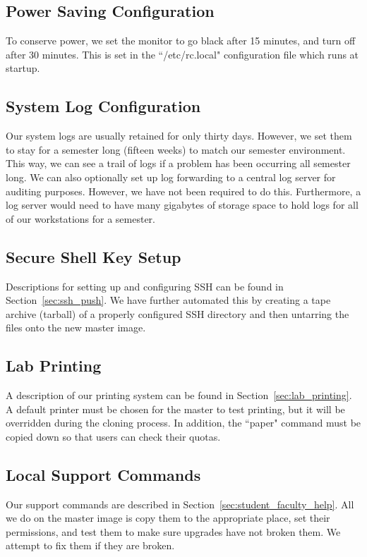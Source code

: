 \subsection{Power Saving Configuration}
To conserve power, we set the monitor to go black after 15 minutes, and turn off after 30 minutes.  This is set in the ``/etc/rc.local" configuration file which runs at startup.  

\subsection{System Log Configuration}
Our system logs are usually retained for only thirty days.  However, we set them to stay for a semester long (fifteen weeks) to match our semester environment.  This way, we can see a trail of logs if a problem has been occurring all semester long.  We can also optionally set up log forwarding to a central log server for auditing purposes.  However, we have not been required to do this.  Furthermore, a log server would need to have many gigabytes of storage space to hold logs for all of our workstations for a semester.  

\subsection{Secure Shell Key Setup}
Descriptions for setting up and configuring SSH can be found in Section~\ref{sec:ssh_push}.  We have further automated this by creating a tape archive (tarball) of a properly configured SSH directory and then untarring the files onto the new master image.  

\subsection{Lab Printing}
A description of our printing system can be found in Section~\ref{sec:lab_printing}.  A default printer must be chosen for the master to test printing, but it will be overridden during the cloning process.  In addition, the ``paper" command must be copied down so that users can check their quotas.  

\subsection{Local Support Commands}
Our support commands are described in Section~\ref{sec:student_faculty_help}.  All we do on the master image is copy them to the appropriate place, set their permissions, and test them to make sure upgrades have not broken them.  We attempt to fix them if they are broken. 

